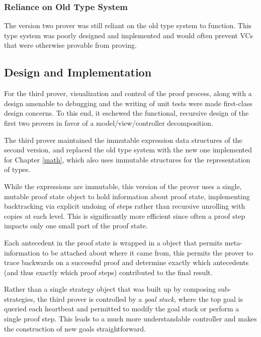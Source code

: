 		\subsubsection{Reliance on Old Type System}

The version two prover was still reliant on the old type system to function.  This type system was poorly designed and implemented and would often prevent VCs that were otherwise provable from proving.

	\subsection{Design and Implementation}

For the third prover, visualization and control of the proof process, along with a design amenable to debugging and the writing of unit tests were made first-class design concerns.  To this end, it eschewed the functional, recursive design of the first two provers in favor of a model/view/controller decomposition.

The third prover maintained the immutable expression data structures of the second version, and replaced the old type system with the new one implemented for Chapter \ref{math}, which also uses immutable structures for the representation of types.

While the expressions are immutable, this version of the prover uses a single, mutable proof state object to hold information about proof state, implementing backtracking via explicit undoing of steps rather than recursive unrolling with copies at each level.  This is significantly more efficient since often a proof step impacts only one small part of the proof state.

Each antecedent in the proof state is wrapped in a object that permits meta-information to be attached about where it came from, this permits the prover to trace backwards on a successful proof and determine exactly which antecedents (and thus exactly which proof steps) contributed to the final result.

Rather than a single strategy object that was built up by composing sub-strategies, the third prover is controlled by a \emph{goal stack}, where the top goal is queried each heartbeat and permitted to modify the goal stack or perform a single proof step.  This leads to a much more understandable controller and makes the construction of new goals straightforward.

